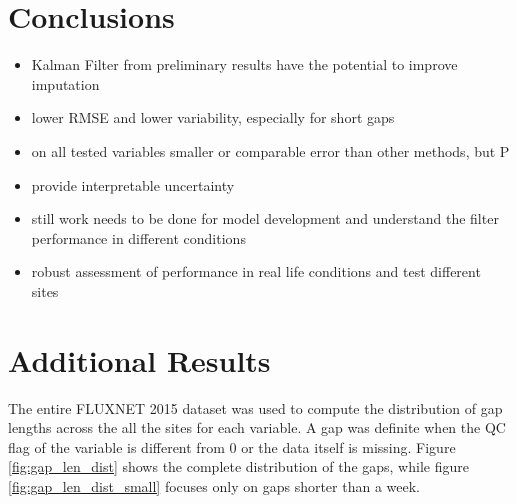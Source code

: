 \documentclass{article}
\let\Oldsection\section
\renewcommand{\section}{\FloatBarrier\Oldsection}
\begin{document}
\section{Conclusions}

\begin{itemize}
    \item Kalman Filter from preliminary results have the potential to improve imputation
    \item lower RMSE and lower variability, especially for short gaps  
    \item on all tested variables smaller or comparable error than other methods, but P
    \item provide interpretable uncertainty
    \item still work needs to be done for model development and understand the filter performance in different conditions
    \item robust assessment of performance in real life conditions and test different sites
\end{itemize}


\printbibliography

\appendix

\FloatBarrier


\section{Additional Results}

The entire FLUXNET 2015 dataset was used to compute the distribution of gap lengths across the all the sites for each variable. A gap was definite when the QC flag of the variable is different from 0 or the data itself is missing. Figure \ref{fig:gap_len_dist} shows the complete distribution of the gaps, while figure \ref{fig:gap_len_dist_small} focuses only on gaps shorter than a week.
\end{document}
